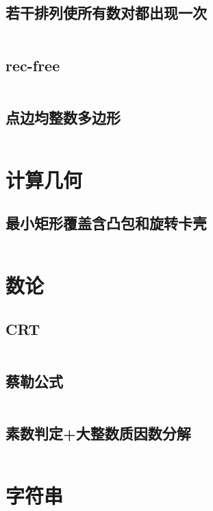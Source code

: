 \documentclass{article}
\begin{document}
\subsection{若干排列使所有数对都出现一次}
\inputminted[breaklines]{c++}{../构造/若干排列使所有数对都出现一次.cpp}

\subsection{rec-free}
\inputminted[breaklines]{c++}{../构造/rec-free.cpp}

\subsection{点边均整数多边形}
\inputminted[breaklines]{c++}{../构造/点边均整数多边形.cpp}

\newpage
\section{计算几何}
\subsection{最小矩形覆盖含凸包和旋转卡壳}
\inputminted[breaklines]{c++}{../计算几何/最小矩形覆盖含凸包和旋转卡壳.cpp}

\newpage
\section{数论}
\subsection{CRT}
\inputminted[breaklines]{c++}{../数论/CRT.cpp}

\subsection{蔡勒公式}
\inputminted[breaklines]{c++}{../数论/蔡勒公式.cpp}

\subsection{素数判定+大整数质因数分解}
\inputminted[breaklines]{c++}{../数论/素数判定+大整数质因数分解.cpp}

\newpage
\section{字符串}
\end{document}
